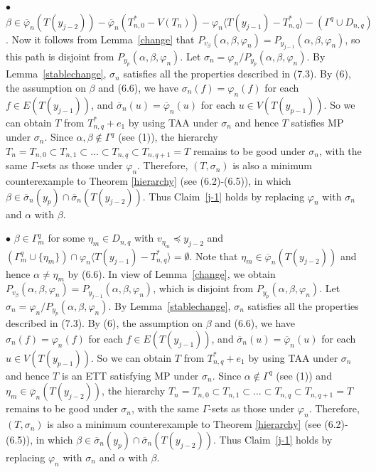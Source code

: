 \documentclass[11pt]{article}
\newcommand{\phibar}{\overline{\varphi}}
\begin{document}
$\bullet$  $\beta \in \overline{\varphi}_n(T(y_{j-2}))- \phibar_n(T_{n,0}^*-V(T_n)) - \varphi_n \langle 
T(y_{j-1}) - T_{n,q}^* \rangle -(\Gamma^{q}\cup D_{n,q})$.  Now it follows from Lemma~\ref{change} that $P_{v_{\beta}} 
(\alpha, \beta, \varphi_n) = P_{y_{j-1}}(\alpha, \beta, \varphi_n)$, so this path is disjoint from $P_{y_p}(\alpha, \beta, \varphi_n)$.  Let $\sigma_n=\varphi_n/P_{y_p}(\alpha, \beta, \varphi_n)$. By Lemma~\ref{stablechange},  $\sigma_n$ 
satisfies all the properties described in (7.3). By (6), the assumption on $\beta$ and (6.6), we have $\sigma_n(f)=
\varphi_n(f)$ for each $f\in E(T(y_{j-1}))$, and $\overline{\sigma}_n(u)=\overline{\varphi}_n(u)$ for each 
$u\in V(T(y_{p-1}))$.  So we can obtain $T$ from $T_{n,q}^*+e_1$ by using TAA under $\sigma_n$ and hence $T$ satisfies 
MP under $\sigma_n$. Since $\alpha, \beta \notin \Gamma^q$ (see (1)), the hierarchy $T_n=T_{n,0} \subset 
T_{n,1} \subset \ldots \subset T_{n,q} \subset T_{n,q+1}=T$ remains to be good under $\sigma_n$, with the 
same $\Gamma$-sets as those under $\varphi_n$. Therefore, $(T, \sigma_n)$ is also a minimum counterexample to Theorem 
\ref{hierarchy} (see (6.2)-(6.5)), in which $\beta \in \overline{\sigma}_n(y_p)\cap\overline{\sigma}_n(T(y_{j-2}))$. 
Thus Claim~\ref{j-1} holds by replacing $\varphi_n$ with $\sigma_n$ and $\alpha$ with $\beta$. 

$\bullet$ $\beta \in\Gamma^{q}_m$ for some $\eta_m\in D_{n,q}$ with $v_{\eta_m} \preceq y_{j-2}$ and $(\Gamma^{q}_m 
\cup \{\eta_m\}) \cap \varphi_n \langle T(y_{j-1}) - T_{n,q}^* \rangle=\emptyset$. Note that $\eta_m \in \overline{\varphi}_n(T(y_{j-2}))$ and hence $\alpha\neq \eta_m$ by (6.6).  In view of Lemma~\ref{change}, we obtain
$P_{v_{\beta}} (\alpha, \beta, \varphi_n) = P_{y_{j-1}} (\alpha, \beta, \varphi_n)$, which is disjoint from 
$P_{y_p} (\alpha, \beta, \varphi_n)$. Let $\sigma_n=\varphi_n/P_{y_p} (\alpha, \beta, \varphi_n)$.
By Lemma~\ref{stablechange},  $\sigma_n$ satisfies all the properties described in (7.3). By (6), the assumption 
on $\beta$ and (6.6), we have $\sigma_n(f)=\varphi_n(f)$ for each $f\in E(T(y_{j-1}))$, and $\overline{\sigma}_n(u)=\overline{\varphi}_n(u)$ for each $u\in V(T(y_{p-1}))$.  So we can obtain $T$ from $T_{n,q}^*+e_1$ 
by using TAA under $\sigma_n$ and hence $T$ is an ETT satisfying MP under $\sigma_n$. Since $\alpha \notin \Gamma^q$ 
(see (1)) and $\eta_m \in \overline{\varphi}_n(T(y_{j-2}))$, the hierarchy $T_n=T_{n,0} \subset T_{n,1} \subset 
\ldots \subset T_{n,q} \subset T_{n,q+1}=T$ remains to be good under $\sigma_n$, with the same $\Gamma$-sets as 
those under $\varphi_n$. Therefore, $(T, \sigma_n)$ is also a minimum counterexample to Theorem \ref{hierarchy} 
(see (6.2)-(6.5)), in which $\beta \in \overline{\sigma}_n(y_p)\cap\overline{\sigma}_n(T(y_{j-2}))$. Thus Claim~\ref{j-1} holds by replacing $\varphi_n$ with $\sigma_n$ and $\alpha$ with $\beta$. 
\end{document}
